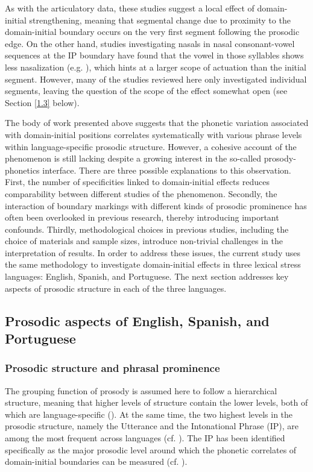 \documentclass[output=paper]{langscibook}
\begin{document}
As with the articulatory data, these studies suggest a local effect of domain-initial strengthening, meaning that segmental change due to proximity to the domain-initial boundary occurs on the very first segment following the prosodic edge. On the other hand, studies investigating nasals in nasal consonant-vowel sequences at the IP boundary have found that the vowel in those syllables shows less nasalization (e.g. \citealt{ckk17}), which hints at a larger scope of actuation than the initial segment. However, many of the studies reviewed here only investigated individual segments, leaving the question of the scope of the effect somewhat open (see Section \ref{1.3} below).

The body of work presented above suggests that the phonetic variation associated with domain-initial positions correlates systematically with various phrase levels within language-specific prosodic structure. However, a cohesive account of the phenomenon is still lacking despite a growing interest in the so-called prosody-phonetics interface. There are three possible explanations to this observation. First, the number of specificities linked to domain-initial effects reduces comparability between different studies of the phenomenon. Secondly, the interaction of boundary markings with different kinds of prosodic prominence has often been overlooked in previous research, thereby introducing important confounds. Thirdly, methodological choices in previous studies, including the choice of materials and sample sizes, introduce non-trivial challenges in the interpretation of results. In order to address these issues, the current study uses the same methodology to investigate domain-initial effects in three lexical stress languages: English, Spanish, and Portuguese. The next section addresses key aspects of prosodic structure in each of the three languages.


\subsection{Prosodic aspects of English, Spanish, and Portuguese}
\subsubsection{Prosodic structure and phrasal prominence}
The grouping function of prosody is assumed here to follow a hierarchical structure, meaning that higher levels of structure contain the lower levels, both of which are language-specific (\citealt{j14}). At the same time, the two highest levels in the prosodic structure, namely the Utterance and the Intonational Phrase (IP), are among the most frequent across languages (cf. \citealt{j05a, j14}). The IP has been identified specifically as the major prosodic level around which the phonetic correlates of domain-initial boundaries can be measured (cf. \citealt{kcfh03}). 
\end{document}
